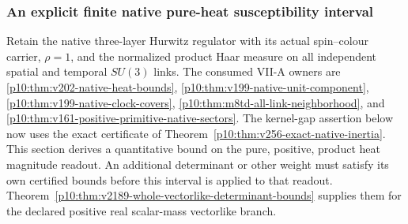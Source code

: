 \documentclass[12pt,a4paper]{article}
\begin{document}



\subsubsection{An explicit finite native pure-heat susceptibility interval}
\label{p10:sec:next187-native-heat-interval}

Retain the native three-layer Hurwitz regulator with its actual spin--colour
carrier, $\rho=1$, and the normalized product Haar measure on all independent
spatial and temporal $SU(3)$ links. The consumed VII-A owners are
\ref{p10:thm:v202-native-heat-bounds},
\ref{p10:thm:v199-native-unit-component},
\ref{p10:thm:v199-native-clock-covers},
\ref{p10:thm:m8td-all-link-neighborhood}, and
\ref{p10:thm:v161-positive-primitive-native-sectors}.
The kernel-gap assertion below now uses the exact certificate of
Theorem~\ref{p10:thm:v256-exact-native-inertia}.
This section derives a quantitative bound on the pure, positive, product heat
magnitude readout. An additional determinant or other weight must satisfy its
own certified bounds before this interval is applied to that readout.
Theorem~\ref{p10:thm:v2189-whole-vectorlike-determinant-bounds} supplies
them for the declared positive real scalar-mass vectorlike branch.
\end{document}
